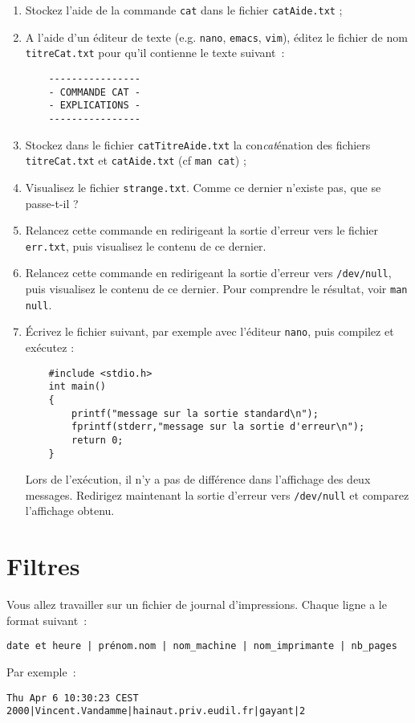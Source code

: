 \documentclass[a4paper]{article}
\begin{document}
\begin{enumerate}
\item Stockez l'aide de la commande \texttt{cat} dans le fichier
  \texttt{catAide.txt} ;
\item A l'aide d'un éditeur de texte (e.g. \texttt{nano},
  \texttt{emacs}, \texttt{vim}), éditez le fichier de nom
  \texttt{titreCat.txt} pour qu'il contienne le texte
  suivant~:
\begin{verbatim}
	----------------
	- COMMANDE CAT -
	- EXPLICATIONS -
	----------------
\end{verbatim}
\item Stockez dans le fichier \texttt{catTitreAide.txt} la
  con\emph{cat}énation des fichiers \texttt{titreCat.txt} et
  \texttt{catAide.txt} (cf \texttt{man cat}) ;    
\item Visualisez le fichier \texttt{strange.txt}. Comme ce
  dernier n'existe pas, que se passe-t-il ?
\item Relancez cette commande en redirigeant la sortie d'erreur vers
  le fichier \texttt{err.txt}, puis visualisez le contenu de ce dernier.
\item Relancez cette commande en redirigeant la sortie d'erreur vers
  \texttt{/dev/null}, puis visualisez le contenu de ce dernier. Pour
  comprendre le résultat, voir \texttt{man null}.
\item Écrivez le fichier suivant, par exemple avec l'éditeur
  \texttt{nano}, puis compilez et exécutez :
\begin{verbatim}
	#include <stdio.h>
	int main()
	{
		printf("message sur la sortie standard\n");
		fprintf(stderr,"message sur la sortie d'erreur\n");
		return 0;
	}
\end{verbatim}
  Lors de l'exécution, il n'y a pas de différence dans l'affichage des
  deux messages.  Redirigez maintenant la sortie d'erreur vers
  \texttt{/dev/null} et comparez l'affichage obtenu.
\end{enumerate}


\section{Filtres}

Vous allez travailler sur un fichier de journal d'impressions. Chaque
ligne a le format suivant~:

\texttt{date et heure | prénom.nom | nom\_machine | nom\_imprimante | nb\_pages}

Par exemple~:

\texttt{Thu Apr  6 10:30:23 CEST 2000|Vincent.Vandamme|hainaut.priv.eudil.fr|gayant|2}
\end{document}

